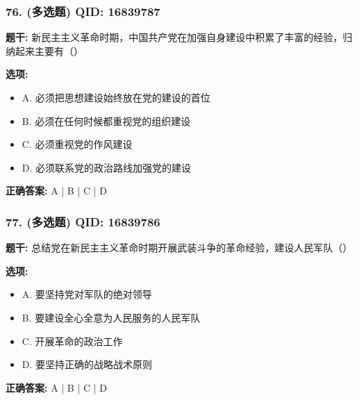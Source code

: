 \documentclass[12pt,UTF8]{ctexart}
\begin{document}
\subsubsection*{76. (多选题) \small QID: 16839787}

\textbf{题干:}
新民主主义革命时期，中国共产党在加强自身建设中积累了丰富的经验，归纳起来主要有（）

\textbf{选项:}
\begin{itemize}[leftmargin=*]

  \item A. 必须把思想建设始终放在党的建设的首位

  \item B. 必须在任何时候都重视党的组织建设

  \item C. 必须重视党的作风建设

  \item D. 必须联系党的政治路线加强党的建设

\end{itemize}

\textbf{正确答案:}
A | B | C | D

\vspace{0.3em}\hrulefill\vspace{0.7em}

\subsubsection*{77. (多选题) \small QID: 16839786}

\textbf{题干:}
总结党在新民主主义革命时期开展武装斗争的革命经验，建设人民军队（）

\textbf{选项:}
\begin{itemize}[leftmargin=*]

  \item A. 要坚持党对军队的绝对领导

  \item B. 要建设全心全意为人民服务的人民军队

  \item C. 开展革命的政治工作

  \item D. 要坚持正确的战略战术原则

\end{itemize}

\textbf{正确答案:}
A | B | C | D

\vspace{0.3em}\hrulefill\vspace{0.7em}
\end{document}

